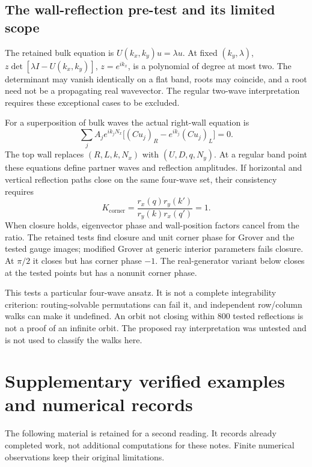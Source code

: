 \documentclass[11pt,a4paper,oneside]{report}
\newcommand{\Id}{I}
\numberwithin{equation}{chapter}
\begin{document}
\section{The wall-reflection pre-test and its limited scope}

The retained bulk equation is \(U(k_x,k_y)u=\lambda u\).
At fixed \((k_y,\lambda)\),
\(z\det[\lambda\Id-U(k_x,k_y)]\), \(z=e^{ik_x}\), is a
polynomial of degree at most two. The determinant may vanish
identically on a flat band, roots may coincide, and a root need not
be a propagating real wavevector. The regular two-wave interpretation
requires these exceptional cases to be excluded.

For a superposition of bulk waves the actual right-wall equation is
\begin{equation}
\sum_jA_j e^{ik_jN_x}
\big[(Cu_j)_R-e^{ik_j}(Cu_j)_L\big]=0.
\end{equation}
The top wall replaces \((R,L,k,N_x)\) with \((U,D,q,N_y)\).
At a regular band point these equations define partner waves and
reflection amplitudes. If horizontal and vertical reflection paths
close on the same four-wave set, their consistency requires
\begin{equation}
K_{\mathrm{corner}}
=\frac{r_x(q)r_y(k')}{r_y(k)r_x(q')}=1.
\end{equation}
When closure holds, eigenvector phase and wall-position factors cancel
from the ratio. The retained tests find closure and unit corner phase
for Grover and the tested gauge images; modified Grover at generic
interior parameters fails closure. At \(\pi/2\) it closes but has
corner phase \(-1\). The real-generator variant below closes at the
tested points but has a nonunit corner phase.

This tests a particular four-wave ansatz. It is not a complete
integrability criterion: routing-solvable permutations can fail it,
and independent row/column walks can make it undefined. An orbit
not closing within 800 tested reflections is not a proof of an
infinite orbit. The proposed ray interpretation was untested and is
not used to classify the walks here.


\chapter{Supplementary verified examples and numerical records}
\label{app:additional}
\label{app:record}

The following material is retained for a second reading. It records
already completed work, not additional computations for these notes.
Finite numerical observations keep their original limitations.
\end{document}
